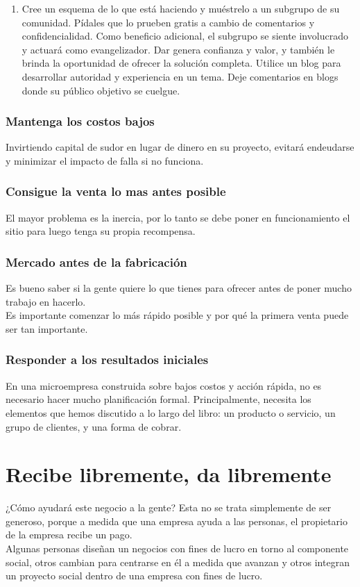 \documentclass[10pt]{book}
\begin{document}
\begin{enumerate}[\bfseries 1.]
			\item Cree un esquema de lo que está haciendo y muéstrelo a un subgrupo de su comunidad. Pídales que lo prueben gratis a cambio de comentarios y confidencialidad. Como beneficio adicional, el subgrupo se siente involucrado y actuará como evangelizador. Dar genera confianza y valor, y también le brinda la oportunidad de ofrecer la solución completa. Utilice un blog para desarrollar autoridad y experiencia en un tema. Deje comentarios en blogs donde su público objetivo se cuelgue.
		\end{enumerate}

		    \subsubsection{Mantenga los costos bajos}
		    Invirtiendo capital de sudor en lugar de dinero en su proyecto, evitará
endeudarse y minimizar el impacto de falla si no funciona.

		    \subsubsection{Consigue la venta lo mas antes posible}
		    El mayor problema es la inercia, por lo tanto se debe poner en funcionamiento el sitio para luego tenga su propia recompensa.

		    \subsubsection{Mercado antes de la fabricación}
		    Es bueno saber si la gente quiere lo que tienes para ofrecer antes de poner mucho trabajo en hacerlo.\\
		    Es importante comenzar lo más rápido posible y por qué la primera venta puede ser tan importante.

		    \subsubsection{Responder a los resultados iniciales}
		    En una microempresa construida sobre bajos costos y acción rápida, no es necesario hacer mucho planificación formal. Principalmente, necesita los elementos que hemos discutido a lo largo del libro: un producto o servicio, un grupo de clientes, y una forma de cobrar.
		    
	\section{Recibe libremente, da libremente}	    
	¿Cómo ayudará este negocio a la gente? Esta no se trata simplemente de ser generoso, porque a medida que una empresa ayuda a las personas, el propietario de la empresa recibe un pago.\\
	Algunas personas diseñan un negocios con fines de lucro en torno al componente social, otros cambian para centrarse en él a medida que avanzan y otros integran un proyecto social dentro de una empresa con fines de lucro.
\end{document}
